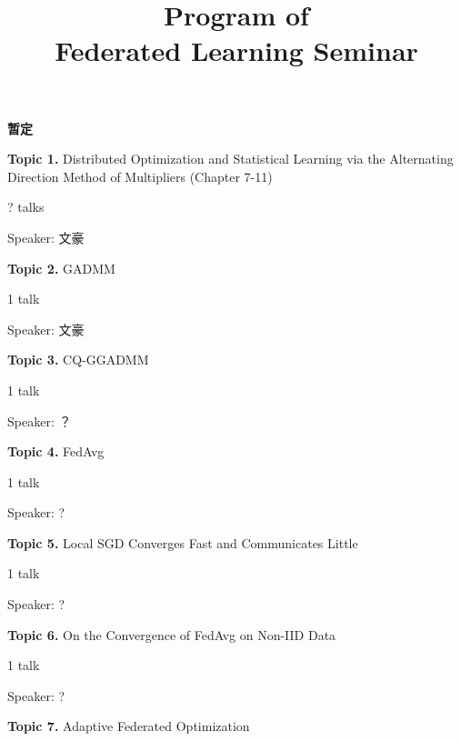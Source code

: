 
\title{\Huge Program of \\ Federated Learning Seminar}
\author{}
\date{}

\maketitle

{\bfseries \large 暂定}

\vspace{2em}

{\bfseries \large Topic 1.} Distributed Optimization and Statistical Learning via the Alternating Direction Method of Multipliers (Chapter 7-11) \cite{boyd2011distributed}

? talks

Speaker: 文豪

\vspace{2em}

{\bfseries \large Topic 2.} GADMM \cite{elgabli2020gadmm}

1 talk

Speaker: 文豪

\vspace{2em}

{\bfseries \large Topic 3.} CQ-GGADMM \cite{issaid2020cq-ggadmm}

1 talk

Speaker: ？

\vspace{2em}

{\bfseries \large Topic 4.} FedAvg \cite{mcmahan2017fed_avg}

1 talk

Speaker: ?

\vspace{2em}

{\bfseries \large Topic 5.} Local SGD Converges Fast and Communicates Little \cite{stich2018local}

1 talk

Speaker: ?

\vspace{2em}

{\bfseries \large Topic 6.} On the Convergence of FedAvg on Non-IID Data \cite{li2019convergence}

1 talk

Speaker: ?

\vspace{2em}

{\bfseries \large Topic 7.} Adaptive Federated Optimization \cite{reddi2020fed_opt}

